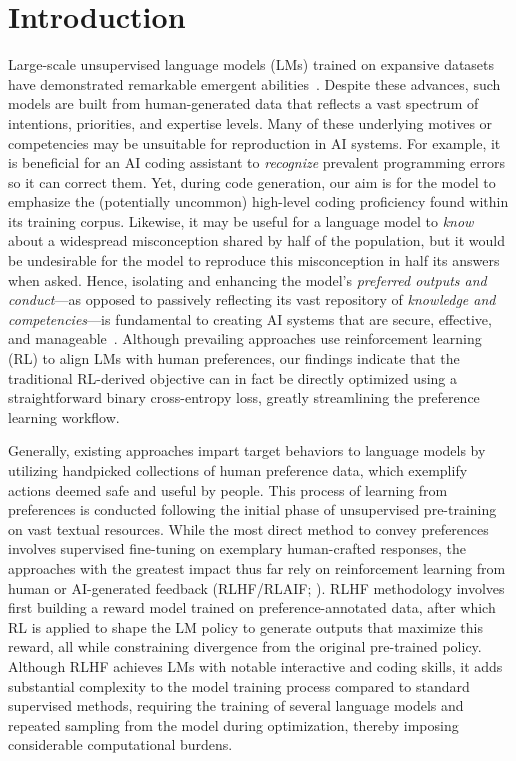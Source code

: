 \section{Introduction}
Large-scale unsupervised language models (LMs) trained on expansive datasets have demonstrated remarkable emergent abilities~\citep{chowdhery2022palm, brown2020language, touvron2023llama, bubeck2023sparks}. Despite these advances, such models are built from human-generated data that reflects a vast spectrum of intentions, priorities, and expertise levels. Many of these underlying motives or competencies may be unsuitable for reproduction in AI systems. For example, it is beneficial for an AI coding assistant to \textit{recognize} prevalent programming errors so it can correct them. Yet, during code generation, our aim is for the model to emphasize the (potentially uncommon) high-level coding proficiency found within its training corpus. Likewise, it may be useful for a language model to \textit{know} about a widespread misconception shared by half of the population, but it would be undesirable for the model to reproduce this misconception in half its answers when asked. Hence, isolating and enhancing the model’s \emph{preferred outputs and conduct}—as opposed to passively reflecting its vast repository of \textit{knowledge and competencies}—is fundamental to creating AI systems that are secure, effective, and manageable~\citep{ouyang2022training}. Although prevailing approaches use reinforcement learning (RL) to align LMs with human preferences, our findings indicate that the traditional RL-derived objective can in fact be directly optimized using a straightforward binary cross-entropy loss, greatly streamlining the preference learning workflow.

Generally, existing approaches impart target behaviors to language models by utilizing handpicked collections of human preference data, which exemplify actions deemed safe and useful by people. This process of learning from preferences is conducted following the initial phase of unsupervised pre-training on vast textual resources. While the most direct method to convey preferences involves supervised fine-tuning on exemplary human-crafted responses, the approaches with the greatest impact thus far rely on reinforcement learning from human or AI-generated feedback (RLHF/RLAIF; \citep{christiano2017deep, bai2022constitutional}). RLHF methodology involves first building a reward model trained on preference-annotated data, after which RL is applied to shape the LM policy to generate outputs that maximize this reward, all while constraining divergence from the original pre-trained policy. Although RLHF achieves LMs with notable interactive and coding skills, it adds substantial complexity to the model training process compared to standard supervised methods, requiring the training of several language models and repeated sampling from the model during optimization, thereby imposing considerable computational burdens.

